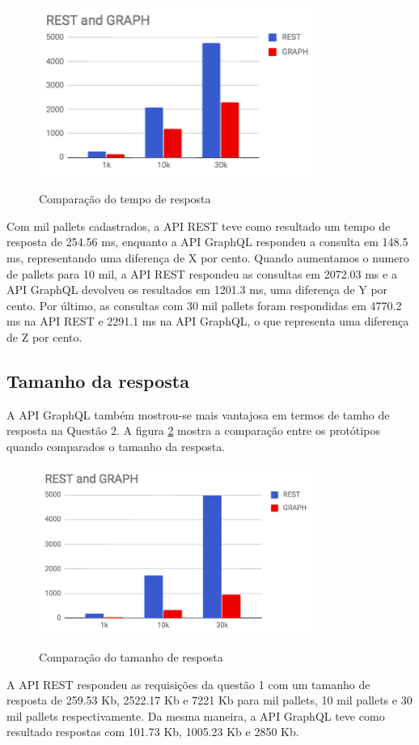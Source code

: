 \begin{figure}[htbp]
    \centering
    \includegraphics[width=0.8\textwidth]{figuras/Q2-result-request-time.png}
    \label{fig:q2-time}
    \caption{Comparação do tempo de resposta}
    \author{fonte: Autor}
\end{figure}

Com mil pallets cadastrados, a API REST teve como resultado um tempo de resposta de 254.56 ms, enquanto a API GraphQL respondeu a consulta em 148.5 ms, representando uma diferença de X por cento. Quando aumentamos o numero de pallets para 10 mil, a API REST respondeu as consultas em 2072.03 ms e a API GraphQL devolveu os resultados em 1201.3 ms, uma diferença de Y por cento. Por último, as consultas com 30 mil pallets foram respondidas em 4770.2 ms na API REST e 2291.1 ms na API GraphQL, o que representa uma diferença de Z por cento.

\subsection{Tamanho da resposta}

A API GraphQL também mostrou-se mais vantajosa em termos de tamho de resposta na Questão 2. A figura \ref{fig:q2-size} mostra a comparação entre os protótipos quando comparados o tamanho da resposta.

\begin{figure}[htbp]
    \centering
    \includegraphics[width=0.8\textwidth]{figuras/Q1-size.png}
    \label{fig:q2-size}
    \caption{Comparação do tamanho de resposta}
    \author{fonte: Autor}
\end{figure}

A API REST respondeu as requisições da questão 1 com um tamanho de resposta de 259.53 Kb, 2522.17 Kb e 7221 Kb para mil pallets, 10 mil pallets e 30 mil pallets respectivamente. Da mesma maneira, a API GraphQL teve como resultado respostas com 101.73 Kb, 1005.23 Kb e 2850 Kb. 

    